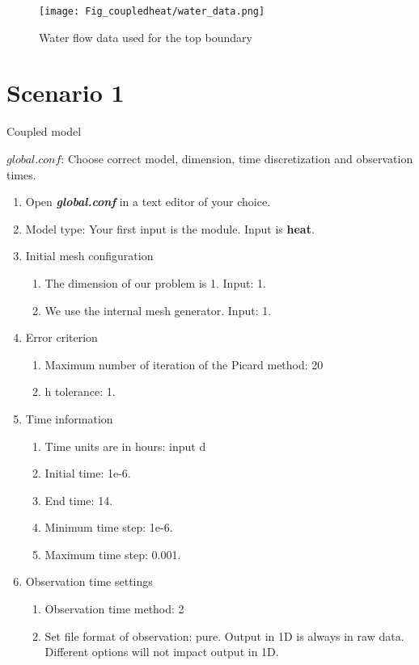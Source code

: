 \begin{figure}[!h]
\centering
\texttt{[image: Fig\_coupledheat/water\_data.png]}
\caption{Water flow data used for the top boundary}
\end{figure}
\newpage

\section*{Scenario 1}

Coupled model

$global.conf$: Choose correct model, dimension, time discretization and observation times.
\begin{enumerate}
\item Open \textbf{\emph{global.conf}} in a text editor of your choice. 
\item Model type: Your first input is the module. Input is \textbf{heat}.
\item Initial mesh configuration \begin{enumerate}
\item The dimension of our problem is 1. Input: 1.
\item We use the internal mesh generator. Input: 1. 
\end{enumerate}
\item Error criterion \begin{enumerate} 
\item Maximum number of iteration of the Picard method: 20 
\item h tolerance: 1.
\end{enumerate}
\item Time information 
\begin{enumerate} 
\item Time units are in hours: input d
\item Initial time: 1e-6.
\item End time: 14.
\item Minimum time step: 1e-6.
\item Maximum time step: 0.001.
\end{enumerate}
\item Observation time settings \begin{enumerate}
\item Observation time method: 2
\item Set file format of observation: pure. Output in 1D is always in raw data. Different options will not impact output in 1D.

\end{enumerate}
\end{enumerate}

